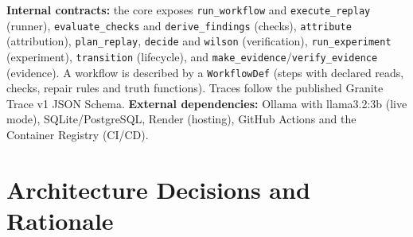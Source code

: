 \textbf{Internal contracts:} the core exposes \texttt{run\_\allowbreak{}workflow} and \texttt{execute\_\allowbreak{}replay} (runner), \texttt{evaluate\_\allowbreak{}checks} and \texttt{derive\_\allowbreak{}findings} (checks), \texttt{attribute} (attribution), \texttt{plan\_\allowbreak{}replay}, \texttt{decide} and \texttt{wilson} (verification), \texttt{run\_\allowbreak{}experiment} (experiment), \texttt{transition} (lifecycle), and \texttt{make\_\allowbreak{}evidence}/\texttt{verify\_\allowbreak{}evidence} (evidence). A workflow is described by a \texttt{WorkflowDef} (steps with declared reads, checks, repair rules and truth functions). Traces follow the published Granite Trace v1 JSON Schema. \textbf{External dependencies:} Ollama with llama3.2:3b (live mode), SQLite/PostgreSQL, Render (hosting), GitHub Actions and the Container Registry (CI/CD).

\section{Architecture Decisions and Rationale}

